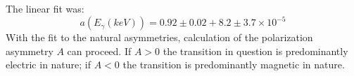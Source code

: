 The linear fit was:
\begin{equation}
\label{eqn:chp3-nat-asym-fit}
a(E_{\gamma}(keV)) = 0.92\pm0.02 + 8.2\pm3.7\times{}10^{-5}
\end{equation}
With the fit to the natural asymmetries, calculation of the polarization asymmetry $A$ can proceed. If $A>0$ the transition in question is predominantly electric in nature; if $A<0$ the transition is predominantly magnetic in nature.